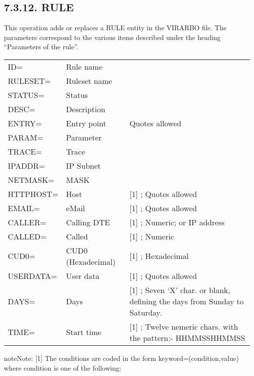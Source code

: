 \documentclass[letterpaper,10pt,english]{sphinxmanual}
\begin{document}
\subsection{7.3.12. RULE}
\label{\detokenize{Installation_Guide:rule}}
This operation adds or replaces a RULE entity in the VIRARBO file. The parameters correspond to the various items described under the heading “Parameters of the rule”.


\begin{savenotes}\sphinxattablestart
\centering
\begin{tabulary}{\linewidth}[t]{|T|T|T|}
\hline
{}\relax &\relax &\relax \\
\hline
ID=
&
Rule name
&\\
\hline
RULESET=
&
Ruleset name
&\\
\hline
STATUS=
&
Status
&\\
\hline
DESC=
&
Description
&\\
\hline
ENTRY=
&
Entry point
&
Quotes allowed
\\
\hline
PARAM=
&
Parameter
&\\
\hline
TRACE=
&
Trace
&\\
\hline
IPADDR=
&
IP Subnet
&\\
\hline
NETMASK=
&
MASK
&\\
\hline
HTTPHOST=
&
Host
&
{[}1{]} ; Quotes allowed
\\
\hline
EMAIL=
&
eMail
&
{[}1{]} ; Quotes allowed
\\
\hline
CALLER=
&
Calling DTE
&
{[}1{]} ; Numeric; or IP address
\\
\hline
CALLED=
&
Called
&
{[}1{]} ; Numeric
\\
\hline
CUD0=
&
CUD0 (Hexadecimal)
&
{[}1{]} ; Hexadecimal
\\
\hline
USERDATA=
&
User data
&
{[}1{]} ; Quotes allowed
\\
\hline
DAYS=
&
Days
&
{[}1{]} ; Seven ‘X’ char. or blank, defining the days
from Sunday to Saturday.
\\
\hline
TIME=
&
Start time
&
{[}1{]} ; Twelve nemeric chars. with the pattern:-
HHMMSSHHMMSS
\\
\hline
\end{tabulary}
\par
\sphinxattableend\end{savenotes}

\begin{sphinxadmonition}{note}{Note:}
{[}1{]} The conditions are coded in the form keyword=(condition,value) where condition is one of the following:
\end{sphinxadmonition}
\end{document}
